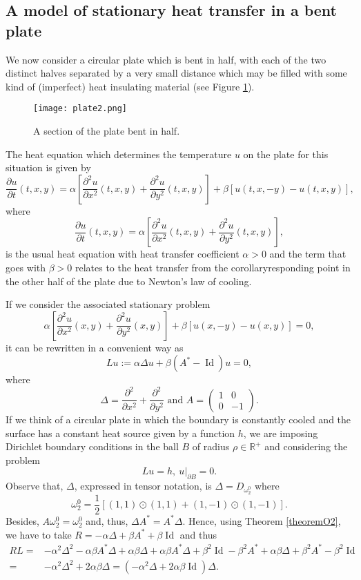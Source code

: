\documentclass[a4paper,12pt,onecolumn]{article}
\theoremstyle{ptheorem}
\theoremstyle{hdef}
\theoremstyle{premark}
\numberwithin{equation}{section}
\numberwithin{figure}{section}
\DeclareMathOperator{\Id}{Id}
\newcommand{\bR}{{\mathbb R}}
\renewcommand{\a}{\alpha}
\renewcommand{\b}{\beta}
\newcommand{\<}{\langle}
\renewcommand{\>}{\rangle}
\renewcommand{\<}{\left<}
\renewcommand{\>}{\right>}
\renewcommand{\(}{\left(}
\renewcommand{\)}{\right)}
\begin{document}
\subsection{A model of stationary heat transfer in a bent plate}
We now consider a circular plate which is bent in half, with each of the two distinct halves separated by a very small distance which may be filled with some kind of (imperfect) heat insulating material (see Figure \ref{figplate}).\par

\begin{figure}\begin{center}\texttt{[image: plate2.png]}\end{center}
	\label{figplate}\caption{A section of the plate bent in half.}\end{figure}
The heat equation which determines the temperature $u$ on the plate for this situation is given by
\[\frac{\partial{u}}{\partial t}(t,x,y)=\a\left[\frac{\partial^2 u}{\partial x^2}(t,x,y)+\frac{\partial^2 u}{\partial y^2}(t,x,y)\right]+\b[u(t,x,-y)-u(t,x,y)],\]
where 
\[\frac{\partial{u}}{\partial t}(t,x,y)=\a\left[\frac{\partial^2 u}{\partial x^2}(t,x,y)+\frac{\partial^2 u}{\partial y^2}(t,x,y)\right],\]
is the usual heat equation with heat transfer coefficient $\a>0$ and the term that goes with $\b>0$ relates to the heat transfer from the corollaryresponding point in the other half of the plate due to Newton's law of cooling.\par
If we consider the associated stationary problem
\[\a\left[\frac{\partial^2 u}{\partial x^2}(x,y)+\frac{\partial^2 u}{\partial y^2}(x,y)\right]+\b[u(x,-y)-u(x,y)]=0,\]
it can be rewritten in a convenient way as
\[Lu:=\a\Delta u+\b( A^*-\Id) u=0,\]
where
\[\Delta=\frac{\partial^2 }{\partial x^2}+\frac{\partial^2 }{\partial y^2}\text{ and } A=\begin{pmatrix}1 & 0  \\ 0 & -1\end{pmatrix}.\]
If we think of a circular plate in which the boundary is constantly cooled and the surface has a constant heat source given by a function $h$, we are imposing Dirichlet boundary conditions in the ball $B$ of radius $\rho\in \bR^+$ and considering the problem
\begin{equation}\label{eqrefdisk}Lu=h,\ u|_{\partial B}=0.\end{equation}
Observe that, $\Delta$, expressed in tensor notation, is $\Delta=D_{\omega^0_2}$ where
\[\omega^0_2=\frac{1}{2}\left[(1,1)\odot(1,1)+(1,-1)\odot(1,-1)\right].\]
Besides, $A\omega^0_2=\omega^0_2$ and, thus, $\Delta A^*=A^*\Delta$. Hence, using Theorem \ref{theoremO2}, we have to take $R=-\a\Delta+\b A^*+\b\Id $ and thus
\begin{align*}RL= & -\a^2\Delta^2-\a\b A^*\Delta+\a\beta\Delta+\a\beta A^*\Delta+\b^2\Id-\b^2A^*+\a\b\Delta+\beta^2A^*-\b^2\Id \\ = & -\a^2\Delta^2+2\a\b\Delta=(-\a^2\Delta+2\a\b\Id)\Delta.\end{align*}
\end{document}
